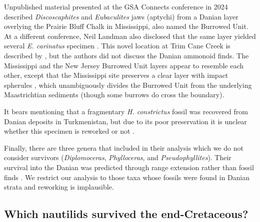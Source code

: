 \documentclass[a4paper]{article}
\begin{document}
Unpublished material presented at the GSA Connects conference in 2024 \parencite{barrera-cuencaAmmoniteJawsCretaceous2024} described \textit{Discoscaphites} and \textit{Eubaculites} jaws (aptychi) from a Danian layer overlying the Prairie Bluff Chalk in Mississippi, also named the Burrowed Unit. At a different conference, Neil Landman also disclosed that the same layer yielded several \textit{E. carinatus} specimen \parencite{landmanAmmonitesCretaceousPaleogeneSites2024}. This novel location at Trim Cane Creek is described by \textcite{sosa-montesdeocaIntenseChangesMain2024}, but the authors did not discuss the Danian ammonoid finds. The Mississippi and the New Jersey Burrowed Unit layers appear to resemble each other, except that the Mississippi site preserves a clear layer with impact spherules \parencite{sosa-montesdeocaIntenseChangesMain2024}, which unambiguously divides the Burrowed Unit from the underlying Maastrichtian sediments (though some burrows do cross the boundary).

It bears mentioning that a fragmentary \textit{H. constrictus} fossil was recovered from Danian deposits in Turkmenistan, but due to its poor preservation it is unclear whether this specimen is reworked or not \parencite{machalskiTerminalMaastrichtianAmmonites2012}.

Finally, there are three genera that \textcite{landmanAmmoniteExtinctionNautilid2014} included in their analysis which we do not consider survivors (\textit{Diplomoceras}, \textit{Phylloceras}, and \textit{Pseudophyllites}). Their survival into the Danian was predicted through range extension rather than fossil finds \parencite{wangImprovedConfidenceIntervals2004, marshallSuddenGradualMolluscan1996}. We restrict our analysis to those taxa whose fossils were found in Danian strata and reworking is implausible. 


\subsection*{Which nautilids survived the end-Cretaceous?}
\end{document}
